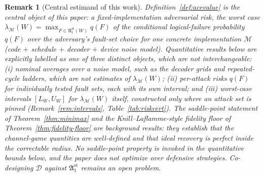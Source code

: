 \documentclass[pdflatex,sn-mathphys-num]{sn-jnl}
\theoremstyle{thmstyleone}
\theoremstyle{thmstyletwo}
\newtheorem{remark}{Remark}
\theoremstyle{thmstylethree}
\begin{document}
\begin{remark}[Central estimand of this work]\label{rem:central-estimand}
Definition~\ref{def:acevalue} is the central object of this paper: a \emph{fixed-implementation} adversarial risk, the worst case $\lambda_{\mathcal{M}}(W)=\max_{F\in\mathfrak{A}_1^{\mathrm{st}}(W)} q(F)$ of the conditional logical-failure probability $q(F)$ over the adversary's fault-set choice for one concrete implementation $\mathcal{M}$ (code $+$ schedule $+$ decoder $+$ device noise model). Quantitative results below are explicitly labelled as one of three distinct objects, which are not interchangeable: \emph{(i) nominal averages} over a noise model, such as the decoder grids and repeated-cycle ladders, which are \emph{not} estimates of $\lambda_{\mathcal{M}}(W)$; \emph{(ii) per-attack risks} $q(F)$ for individually tested fault sets, each with its own interval; and \emph{(iii) worst-case intervals} $[L_W,U_W]$ for $\lambda_{\mathcal{M}}(W)$ itself, constructed only where an attack set is pinned (Remark~\ref{rem:intervals}, Table~\ref{tab:riskcert}). The saddle-point statement of Theorem~\ref{thm:minimax} and the Knill--Laflamme-style fidelity floor of Theorem~\ref{thm:fidelity-floor} are background results: they establish that the channel-game quantities are well-defined and that ideal recovery is perfect inside the correctable radius. No saddle-point property is invoked in the quantitative bounds below, and the paper does not optimize over defensive strategies. Co-designing $\mathcal{D}$ against $\mathfrak{A}_1^{\mathrm{st}}$ remains an open problem.
\end{remark}
\end{document}

